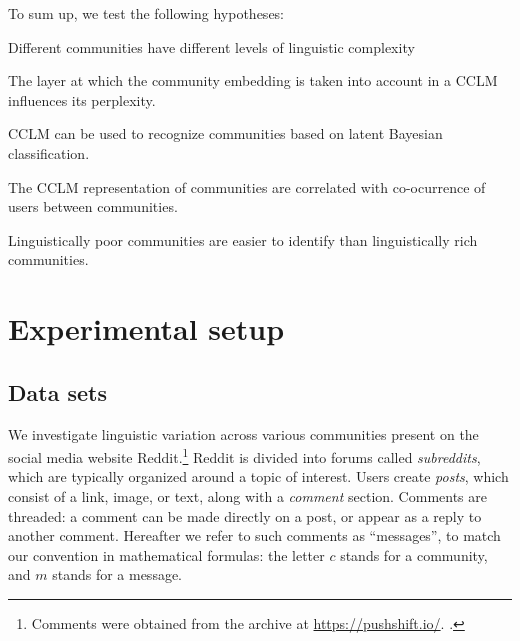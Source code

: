 \documentclass[11pt,a4paper]{article}
\newcommand\jp[1]{\todo[backgroundcolor=blue!10]{JP: #1}}
\begin{document}
To sum up, we test the following hypotheses:
\begin{hypotheses}
\item \label{hyp:varying-complexity} Different communities have different levels of linguistic
  complexity
\item \label{hyp:layer-effect} The layer at which the community embedding is taken into account
  in a CCLM influences its perplexity.
\item \label{hyp:LMCC-works} CCLM can be used to recognize communities based on
  latent Bayesian classification.
\item \label{hyp:extra-linguistic-correlation} The CCLM representation of communities are correlated with
  co-ocurrence of users between communities.
\item \label{hyp:rich-harder-to-identify} Linguistically poor communities are easier to identify than
  linguistically rich communities.
\end{hypotheses}

\jp{Perhaps: Outline of the paper.}

\section{Experimental setup}

\subsection{Data sets}

We investigate linguistic variation across various communities present
on the social media website Reddit.\footnote{Comments were obtained
  from the archive at \url{https://pushshift.io/}.
  \cite{Baumgartner2020}.}
%
Reddit is divided into forums called \textit{subreddits}, 
which are typically organized around a topic of interest. 
Users create \textit{posts}, which consist of a link, image, 
or text, along with a \emph{comment} section. 
Comments are threaded: a comment can be made directly on a post,
or appear as a reply to another comment.
%
Hereafter we refer to such comments as ``messages'', to match our
convention in mathematical formulas: the letter $c$ stands for a
community, and $m$ stands for a message.
\end{document}
